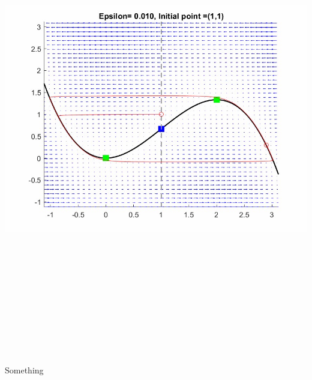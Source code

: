\documentclass[25pt, a0paper, portrait]{tikzposter}
\begin{document}
\begin{columns}
{\begin{tikzfigure}[h!]
	\includegraphics[height=20cm,width=26cm]{Posterpic2.jpg}
\end{tikzfigure}}

\end{columns}
 
\begin{columns}
    {Something
    }
\end{columns}
 
\end{document}
